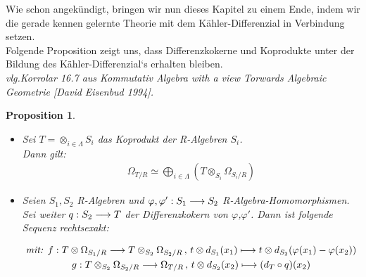 \documentclass[10pt,a4paper]{report}
\newcommand{\comment}[1]{}
\newcommand{\ModulsOfDifferenzials}{Kommutativ Algebra with a view Torwards Algebraic Geometrie [David Eisenbud 1994]}
\newcounter{Aussage}[chapter]
\newtheorem{prop}[Aussage]{Proposition}
\newcommand{\functionfront}[3]{\nolinebreak{#1:#2 \longrightarrow #3}}
\newcommand{\function}[5]{\nolinebreak{#1:#2 \longrightarrow #3 \, , \, #4 \longmapsto #5}}
\newcommand{\divR}[2]{\Omega_{#1/#2}}
\newcommand{\divf}[1]{d_{#1}}
\newcommand{\Tensor}[3]{#1 \otimes_{#2} #3}
\newcommand{\tensor}[3]{#1 \otimes #3}
\begin{document}
Wie schon angekündigt, bringen wir nun dieses Kapitel zu einem Ende, indem wir die gerade kennen gelernte Theorie mit dem Kähler-Differenzial in Verbindung setzen.\\
Folgende Proposition zeigt uns, dass Differenzkokerne und Koprodukte unter der Bildung des Kähler-Differenzial`s erhalten bleiben.\\
\textit{vlg.Korrolar 16.7 aus \ModulsOfDifferenzials.}
\comment{Beide Beweise sind sehr kurz gefasst}
\begin{prop} \comment{\label{Kählerdifferenzial des Kolimes von R-Algebren}}
\ \\
\begin{itemize}
\item[\textbf{1.}]
Sei $T = \otimes_{i \in \Lambda} S_i$ das Koprodukt der R-Algebren $S_i$.\\
Dann gilt:
\begin{gather*}
\divR{T}{R} \simeq \bigoplus_{i\in \Lambda} ( \Tensor{T}{S_i}{\divR{S_i}{R}} )
\end{gather*}
\item[\textbf{2.}]
Seien $S_1,S_2$ R-Algebren und $\functionfront{\varphi,\varphi'}{S_1}{S_2}$ R-Algebra-Homomorphismen. Sei weiter $\functionfront{q}{S_2}{T}$ der Differenzkokern von $\varphi$,$\varphi '$.
Dann ist folgende Sequenz rechtsexakt:
\begin{center}
\begin{gather*}
\textit{mit: } \function{f}{\tensor{T}{S_1}{\divR{S_1}{R}}}{\Tensor{T}{S_2}{\divR{S_2}{R}}}{\tensor{t}{S_2}{\divf{S_1}(x_1)}}{\tensor{t}{S_2}{\divf{S_2}(\varphi(x_1) - \varphi(x_2))}}\\
\function{g}{\Tensor{T}{S_2}{\divR{S_2}{R}}}{\divR{T}{R}}{\tensor{t}{S_2}{\divf{S_2}(x_2)}}{(\divf{T}\circ q)(x_2)}
\end{gather*}
\end{center}
\end{itemize}
\end{prop}
\end{document}
